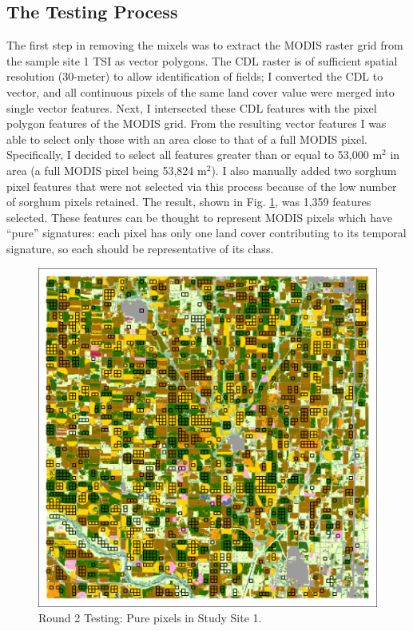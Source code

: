 \subsection*{The Testing Process}

The first step in removing the mixels was to extract the MODIS raster grid from the sample site 1 TSI as vector polygons. The CDL raster is of sufficient spatial resolution (30-meter) to allow identification of fields; I converted the CDL to vector, and all continuous pixels of the same land cover value were merged into single vector features. Next, I intersected these CDL features with the pixel polygon features of the MODIS grid. From the resulting vector features I was able to select only those with an area close to that of a full MODIS pixel. Specifically, I decided to select all features greater than or equal to 53,000 m$^2$ in area (a full MODIS pixel being 53,824 m$^2$). I also manually added two sorghum pixel features that were not selected via this process because of the low number of sorghum pixels retained. The result, shown in Fig. \ref{fig:ss1purepx}, was 1,359 features selected. These features can be thought to represent MODIS pixels which have “pure” signatures: each pixel has only one land cover contributing to its temporal signature, so each should be representative of its class.

\begin{figure}
  \centering
  \includegraphics[width=.9\textwidth]{Graphics/Testing/clip1_30mCDL_pure_pixels.pdf}
  \caption{Round 2 Testing: Pure pixels in Study Site 1.}
  \label{fig:ss1purepx}
\end{figure}

